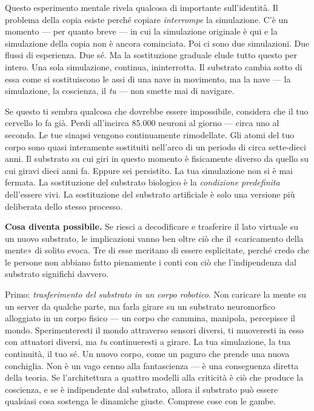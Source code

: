 \documentclass[11pt, twoside, openright]{book}
\begin{document}
Questo esperimento mentale rivela qualcosa di importante sull'identità. Il problema della copia esiste perché copiare \textit{interrompe} la simulazione. C'è un momento --- per quanto breve --- in cui la simulazione originale è qui e la simulazione della copia non è ancora cominciata. Poi ci sono due simulazioni. Due flussi di esperienza. Due sé. Ma la sostituzione graduale elude tutto questo per intero. Una sola simulazione, continua, ininterrotta. Il substrato cambia sotto di essa come si sostituiscono le assi di una nave in movimento, ma la nave --- la simulazione, la coscienza, il \textit{tu} --- non smette mai di navigare.

Se questo ti sembra qualcosa che dovrebbe essere impossibile, considera che il tuo cervello lo fa già. Perdi all'incirca 85.000 neuroni al giorno --- circa uno al secondo. Le tue sinapsi vengono continuamente rimodellate. Gli atomi del tuo corpo sono quasi interamente sostituiti nell'arco di un periodo di circa sette-dieci anni. Il substrato su cui giri in questo momento è fisicamente diverso da quello su cui giravi dieci anni fa. Eppure sei persistito. La tua simulazione non si è mai fermata. La sostituzione del substrato biologico è la \textit{condizione predefinita} dell'essere vivi. La sostituzione del substrato artificiale è solo una versione più deliberata dello stesso processo.

\textbf{Cosa diventa possibile.} Se riesci a decodificare e trasferire il lato virtuale su un nuovo substrato, le implicazioni vanno ben oltre ciò che il «caricamento della mente» di solito evoca. Tre di esse meritano di essere esplicitate, perché credo che le persone non abbiano fatto pienamente i conti con ciò che l'indipendenza dal substrato significhi davvero.

Primo: \textit{trasferimento del substrato in un corpo robotico}. Non caricare la mente su un server da qualche parte, ma farla girare su un substrato neuromorfico alloggiato in un corpo fisico --- un corpo che cammina, manipola, percepisce il mondo. Sperimenteresti il mondo attraverso sensori diversi, ti muoveresti in esso con attuatori diversi, ma \textit{tu} continueresti a girare. La tua simulazione, la tua continuità, il tuo sé. Un nuovo corpo, come un paguro che prende una nuova conchiglia. Non è un vago cenno alla fantascienza --- è una conseguenza diretta della teoria. Se l'architettura a quattro modelli alla criticità è ciò che produce la coscienza, e se è indipendente dal substrato, allora il substrato può essere qualsiasi cosa sostenga le dinamiche giuste. Comprese cose con le gambe.
\end{document}

